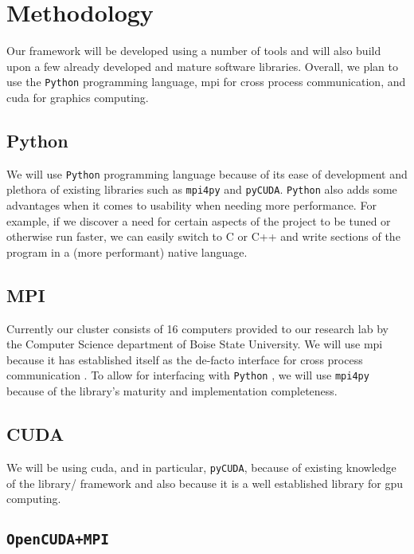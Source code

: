 \section{Methodology}

Our framework will be developed using a number of tools and will also build
upon a few already developed and mature software libraries. Overall, we plan to
use the \texttt{Python} programming language, \gls{mpi} for cross process
communication, and \gls{cuda} for graphics computing.

\subsection{Python}

We will use \texttt{Python} programming language because of its ease of
development and plethora of existing libraries such as \texttt{mpi4py} and
\texttt{pyCUDA}. \texttt{Python} also adds some advantages when it comes to
usability when needing more performance. For example, if we discover a need
for certain aspects of the project to be tuned or otherwise run faster, we can
easily switch to C or C++ and write sections of the program in a (more
performant) native language.

\subsection{MPI}

Currently our cluster consists of 16 computers provided to our research lab by
the Computer Science department of Boise State University. We will use
\gls{mpi} because it has established itself as the de-facto interface for cross
process communication \cite{website:MPI-Tutorial}. To allow for interfacing
with \texttt{Python} \cite{website:mpi-4-python}, we will use \texttt{mpi4py}
because of the library's maturity and implementation completeness.

\subsection{CUDA}

We will be using \gls{cuda}, and in particular, \texttt{pyCUDA}, because of
existing knowledge of the library/ framework and also because it is a well
established library for \gls{gpu} computing.

\subsection{\texttt{OpenCUDA+MPI}}

